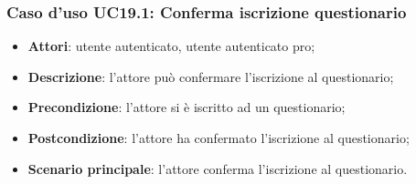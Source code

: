 \subsubsection{Caso d'uso UC19.1: Conferma iscrizione questionario}
\label{UC19.1}
\begin{itemize}
\item\textbf{Attori}: utente autenticato, utente autenticato pro;
\item\textbf{Descrizione}: l'attore può confermare l'iscrizione al questionario;
\item\textbf{Precondizione}: l'attore si è iscritto ad un questionario;
\item\textbf{Postcondizione}: l'attore ha confermato l'iscrizione al questionario;
\item\textbf{Scenario principale}: l'attore conferma l'iscrizione al questionario.
\end{itemize}